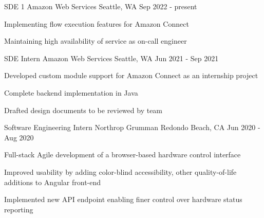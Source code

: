 
\begin{cventries}
	\cventry
	{SDE 1}
	{Amazon Web Services}
	{Seattle, WA}
	{Sep 2022 - present}
	{
		\begin{cvitems}
			\item{Implementing flow execution features for Amazon Connect}
			\item{Maintaining high availability of service as on-call engineer}
		\end{cvitems}
	}
	\cventry
	{SDE Intern}
	{Amazon Web Services}
	{Seattle, WA}
	{Jun 2021 - Sep 2021}
	{
		\begin{cvitems}
			\item{Developed custom module support for Amazon Connect as an internship project}
			\item{Complete backend implementation in Java}
			\item{Drafted design documents to be reviewed by team}
		\end{cvitems}
	}
	\cventry
	{Software Engineering Intern}
	{Northrop Grumman}
	{Redondo Beach, CA}
	{Jun 2020 - Aug 2020}
	{
		\begin{cvitems}
			\item{Full-stack Agile development of a browser-based hardware control interface}
			\item{Improved usability by adding color-blind accessibility, other quality-of-life additions to Angular front-end}
			\item{Implemented new API endpoint enabling finer control over hardware status reporting}
		\end{cvitems}
	}
\end{cventries}
